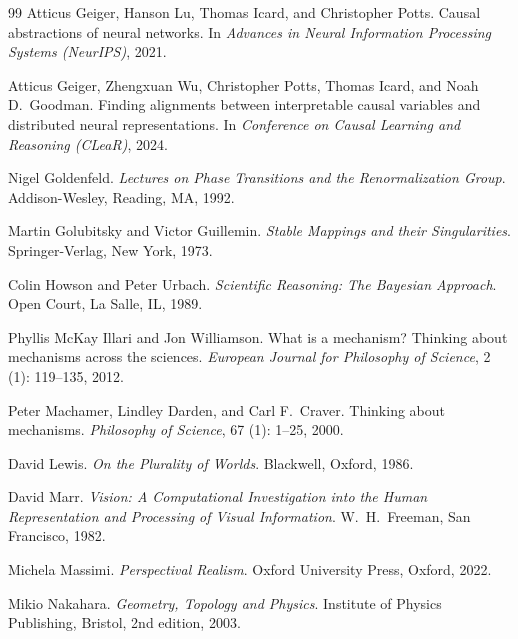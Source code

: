 \documentclass[11pt]{article}
\theoremstyle{remark}
\begin{document}
\begin{thebibliography}{99}
Atticus Geiger, Hanson Lu, Thomas Icard, and Christopher Potts.
\newblock Causal abstractions of neural networks.
\newblock In \emph{Advances in Neural Information Processing Systems
  (NeurIPS)}, 2021.

Atticus Geiger, Zhengxuan Wu, Christopher Potts, Thomas Icard, and Noah D.\
  Goodman.
\newblock Finding alignments between interpretable causal variables and
  distributed neural representations.
\newblock In \emph{Conference on Causal Learning and Reasoning (CLeaR)}, 2024.

Nigel Goldenfeld.
\newblock \emph{Lectures on Phase Transitions and the Renormalization Group}.
\newblock Addison-Wesley, Reading, MA, 1992.

Martin Golubitsky and Victor Guillemin.
\newblock \emph{Stable Mappings and their Singularities}.
\newblock Springer-Verlag, New York, 1973.

Colin Howson and Peter Urbach.
\newblock \emph{Scientific Reasoning: The Bayesian Approach}.
\newblock Open Court, La Salle, IL, 1989.

Phyllis McKay Illari and Jon Williamson.
\newblock What is a mechanism? Thinking about mechanisms across the sciences.
\newblock \emph{European Journal for Philosophy of Science},
  2 (1):\penalty0 119--135, 2012.

Peter Machamer, Lindley Darden, and Carl F.\ Craver.
\newblock Thinking about mechanisms.
\newblock \emph{Philosophy of Science}, 67 (1): 1--25, 2000.

David Lewis.
\newblock \emph{On the Plurality of Worlds}.
\newblock Blackwell, Oxford, 1986.

David Marr.
\newblock \emph{Vision: A Computational Investigation into the Human
  Representation and Processing of Visual Information}.
\newblock W.\ H.\ Freeman, San Francisco, 1982.

Michela Massimi.
\newblock \emph{Perspectival Realism}.
\newblock Oxford University Press, Oxford, 2022.

Mikio Nakahara.
\newblock \emph{Geometry, Topology and Physics}.
\newblock Institute of Physics Publishing, Bristol, 2nd edition, 2003.


\end{thebibliography}
\end{document}
